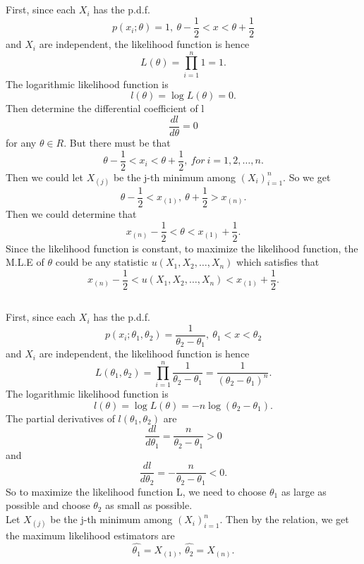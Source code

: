 \documentclass[10.5pt]{article}
\begin{document}
\subsection{}
First, since each $X_i$ has the p.d.f. $$p(x_i;\theta)=1,~\theta-\frac{1}{2}<x<\theta+\frac{1}{2}$$\indent
and $X_i$ are independent, the likelihood function is hence $$L(\theta)=\prod_{i=1}^n1=1.$$\indent
The logarithmic likelihood function is $$l(\theta)=\log L(\theta)=0.$$\indent
Then determine the differential coefficient of l $$\frac{dl}{d\theta}=0$$\indent
for any $\theta\in R$. But there must be that $$\theta-\frac{1}{2}<x_i<\theta+\frac{1}{2},~for ~i=1,2,\dots,n.$$\indent
Then we could let $X_{(j)}$ be the j-th minimum among $(X_i)_{i=1}^n$. So we get $$\theta-\frac{1}{2}<x_{(1)},~\theta+\frac{1}{2}>x_{(n)}.$$\indent
Then we could determine that $$x_{(n)}-\frac{1}{2}<\theta<x_{(1)}+\frac{1}{2}.$$\indent
Since the likelihood function is constant, to maximize the likelihood function, the M.L.E of $\theta$ could be any statistic $u(X_1,X_2,\dots,X_n)$ which satisfies that $$x_{(n)}-\frac{1}{2}<u(X_1,X_2,\dots,X_n)<x_{(1)}+\frac{1}{2}.$$

\subsection{}
First, since each $X_i$ has the p.d.f. $$p(x_i;\theta_1,\theta_2)=\frac{1}{\theta_2-\theta_1},~\theta_1<x<\theta_2$$\indent
and $X_i$ are independent, the likelihood function is hence $$L(\theta_1,\theta_2)=\prod_{i=1}^n\frac{1}{\theta_2-\theta_1}=\frac{1}{(\theta_2-\theta_1)^n}.$$\indent
The logarithmic likelihood function is $$l(\theta)=\log L(\theta)=-n\log(\theta_2-\theta_1).$$\indent
The partial derivatives of $l(\theta_1,\theta_2)$ are $$\frac{dl}{d\theta_1}=\frac{n}{\theta_2-\theta_1}>0$$\indent
and $$\frac{dl}{d\theta_2}=-\frac{n}{\theta_2-\theta_1}<0.$$\indent
So to maximize the likelihood function L, we need to choose $\theta_1$ as large as possible and choose $\theta_2$ as small as possible.\\\indent
Let $X_{(j)}$ be the j-th minimum among $(X_i)_{i=1}^n$. Then by the relation, we get the maximum likelihood estimators are $$\hat{\theta_1}=X_{(1)},~\hat{\theta_2}=X_{(n)}.$$


\section{}
\end{document}
